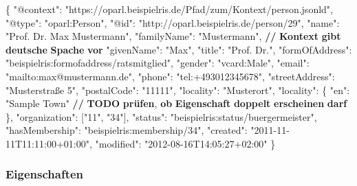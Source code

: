 \documentclass[,a4paper]{article}
\newenvironment{Shaded}{}{}
\newcommand{\DataTypeTok}[1]{\textcolor[rgb]{0.56,0.13,0.00}{{#1}}}
\newcommand{\StringTok}[1]{\textcolor[rgb]{0.25,0.44,0.63}{{#1}}}
\newcommand{\ErrorTok}[1]{\textcolor[rgb]{1.00,0.00,0.00}{\textbf{{#1}}}}
\newcommand{\NormalTok}[1]{{#1}}
\begin{document}
\begin{Shaded}
\begin{Highlighting}[]
\NormalTok{\{}
    \DataTypeTok{"@context"}\NormalTok{: }\StringTok{"https://oparl.beispielris.de/Pfad/zum/Kontext/person.jsonld"}\NormalTok{,}
    \DataTypeTok{"@type"}\NormalTok{: }\StringTok{"oparl:Person"}\NormalTok{,}
    \DataTypeTok{"@id"}\NormalTok{: }\StringTok{"http://oparl.beispielris.de/person/29"}\NormalTok{,}
    \DataTypeTok{"name"}\NormalTok{: }\StringTok{"Prof. Dr. Max Mustermann"}\NormalTok{,}
    \DataTypeTok{"familyName"}\NormalTok{: }\StringTok{"Mustermann"}\NormalTok{, }\ErrorTok{//} \ErrorTok{Kontext} \ErrorTok{gibt} \ErrorTok{deutsche} \ErrorTok{Spache} \ErrorTok{vor}
    \DataTypeTok{"givenName"}\NormalTok{: }\StringTok{"Max"}\NormalTok{,}
    \DataTypeTok{"title"}\NormalTok{: }\StringTok{"Prof. Dr."}\NormalTok{,}
    \DataTypeTok{"formOfAddress"}\NormalTok{: }\StringTok{"beispielris:formofaddress/ratsmitglied"}\NormalTok{,}
    \DataTypeTok{"gender"}\NormalTok{: }\StringTok{"vcard:Male"}\NormalTok{,}
    \DataTypeTok{"email"}\NormalTok{: }\StringTok{"mailto:max@mustermann.de"}\NormalTok{,}
    \DataTypeTok{"phone"}\NormalTok{: }\StringTok{"tel:+493012345678"}\NormalTok{,}
    \DataTypeTok{"streetAddress"}\NormalTok{: }\StringTok{"Musterstraße 5"}\NormalTok{,}
    \DataTypeTok{"postalCode"}\NormalTok{: }\StringTok{"11111"}\NormalTok{,}
    \DataTypeTok{"locality"}\NormalTok{: }\StringTok{"Musterort"}\NormalTok{,}
    \DataTypeTok{"locality"}\NormalTok{: \{}
        \DataTypeTok{"en"}\NormalTok{: }\StringTok{"Sample Town"} \ErrorTok{//} \ErrorTok{TODO} \ErrorTok{prüfen}\NormalTok{, }\ErrorTok{ob} \ErrorTok{Eigenschaft} \ErrorTok{doppelt} \ErrorTok{erscheinen} \ErrorTok{darf}
    \NormalTok{\},}
    \DataTypeTok{"organization"}\NormalTok{: [}\StringTok{"11"}\NormalTok{, }\StringTok{"34"}\NormalTok{],}
    \DataTypeTok{"status"}\NormalTok{: }\StringTok{"beispielris:status/buergermeister"}\NormalTok{,}
    \DataTypeTok{"hasMembership"}\NormalTok{: }\StringTok{"beispielris:membership/34"}\NormalTok{,}
    \DataTypeTok{"created"}\NormalTok{: }\StringTok{"2011-11-11T11:11:00+01:00"}\NormalTok{,}
    \DataTypeTok{"modified"}\NormalTok{: }\StringTok{"2012-08-16T14:05:27+02:00"}
\NormalTok{\}}
\end{Highlighting}
\end{Shaded}

\subsubsection{Eigenschaften}\label{eigenschaften-3}
\end{document}
